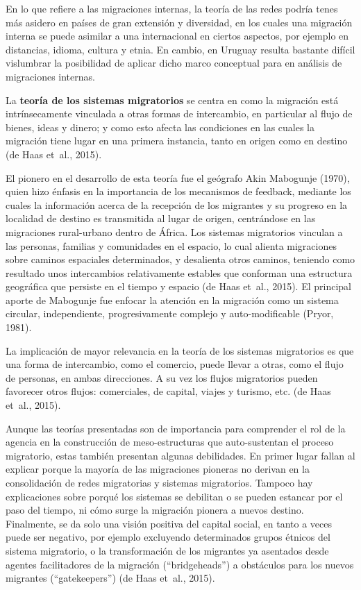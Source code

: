 \documentclass[12pt,spanish,]{article}
\begin{document}
En lo que refiere a las migraciones internas, la teoría de las redes
podría tenes más asidero en países de gran extensión y diversidad, en
los cuales una migración interna se puede asimilar a una internacional
en ciertos aspectos, por ejemplo en distancias, idioma, cultura y etnia.
En cambio, en Uruguay resulta bastante difícil vislumbrar la posibilidad
de aplicar dicho marco conceptual para en análisis de migraciones
internas.

La \textbf{teoría de los sistemas migratorios} se centra en como la
migración está intrínsecamente vinculada a otras formas de intercambio,
en particular al flujo de bienes, ideas y dinero; y como esto afecta las
condiciones en las cuales la migración tiene lugar en una primera
instancia, tanto en origen como en destino (de Haas et~al., 2015).

El pionero en el desarrollo de esta teoría fue el geógrafo Akin
Mabogunje (1970), quien hizo énfasis en la importancia de los mecanismos
de feedback, mediante los cuales la información acerca de la recepción
de los migrantes y su progreso en la localidad de destino es transmitida
al lugar de origen, centrándose en las migraciones rural-urbano dentro
de África. Los sistemas migratorios vinculan a las personas, familias y
comunidades en el espacio, lo cual alienta migraciones sobre caminos
espaciales determinados, y desalienta otros caminos, teniendo como
resultado unos intercambios relativamente estables que conforman una
estructura geográfica que persiste en el tiempo y espacio (de Haas
et~al., 2015). El principal aporte de Mabogunje fue enfocar la atención
en la migración como un sistema circular, independiente, progresivamente
complejo y auto-modificable (Pryor, 1981).

La implicación de mayor relevancia en la teoría de los sistemas
migratorios es que una forma de intercambio, como el comercio, puede
llevar a otras, como el flujo de personas, en ambas direcciones. A su
vez los flujos migratorios pueden favorecer otros flujos: comerciales,
de capital, viajes y turismo, etc. (de Haas et~al., 2015).

Aunque las teorías presentadas son de importancia para comprender el rol
de la agencia en la construcción de meso-estructuras que auto-sustentan
el proceso migratorio, estas también presentan algunas debilidades. En
primer lugar fallan al explicar porque la mayoría de las migraciones
pioneras no derivan en la consolidación de redes migratorias y sistemas
migratorios. Tampoco hay explicaciones sobre porqué los sistemas se
debilitan o se pueden estancar por el paso del tiempo, ni cómo surge la
migración pionera a nuevos destino. Finalmente, se da solo una visión
positiva del capital social, en tanto a veces puede ser negativo, por
ejemplo excluyendo determinados grupos étnicos del sistema migratorio, o
la transformación de los migrantes ya asentados desde agentes
facilitadores de la migración (``bridgeheads'') a obstáculos para los
nuevos migrantes (``gatekeepers'') (de Haas et~al., 2015).
\end{document}

